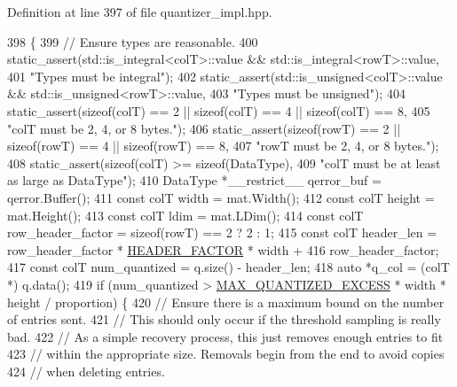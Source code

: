 Definition at line 397 of file quantizer\+\_\+impl.\+hpp.


\begin{DoxyCode}
398                                                                    \{
399   \textcolor{comment}{// Ensure types are reasonable.}
400   static\_assert(std::is\_integral<colT>::value && std::is\_integral<rowT>::value,
401                 \textcolor{stringliteral}{"Types must be integral"});
402   static\_assert(std::is\_unsigned<colT>::value && std::is\_unsigned<rowT>::value,
403                 \textcolor{stringliteral}{"Types must be unsigned"});
404   static\_assert(\textcolor{keyword}{sizeof}(colT) == 2 || \textcolor{keyword}{sizeof}(colT) == 4 || \textcolor{keyword}{sizeof}(colT) == 8,
405                 \textcolor{stringliteral}{"colT must be 2, 4, or 8 bytes."});
406   static\_assert(\textcolor{keyword}{sizeof}(rowT) == 2 || \textcolor{keyword}{sizeof}(rowT) == 4 || \textcolor{keyword}{sizeof}(rowT) == 8,
407                 \textcolor{stringliteral}{"rowT must be 2, 4, or 8 bytes."});
408   static\_assert(\textcolor{keyword}{sizeof}(colT) >= \textcolor{keyword}{sizeof}(DataType),
409                 \textcolor{stringliteral}{"colT must be at least as large as DataType"});
410   DataType *\_\_restrict\_\_ qerror\_buf = qerror.Buffer();
411   \textcolor{keyword}{const} colT width = mat.Width();
412   \textcolor{keyword}{const} colT height = mat.Height();
413   \textcolor{keyword}{const} colT ldim = mat.LDim();
414   \textcolor{keyword}{const} colT row\_header\_factor = \textcolor{keyword}{sizeof}(rowT) == 2 ? 2 : 1;
415   \textcolor{keyword}{const} colT header\_len = row\_header\_factor * \hyperlink{classlbann_1_1lbann__quantizer_afb4315625e371169cabfac56c3f75d37}{HEADER\_FACTOR} * width +
416                           row\_header\_factor;
417   \textcolor{keyword}{const} colT num\_quantized = q.size() - header\_len;
418   \textcolor{keyword}{auto} *q\_col = (colT *) q.data();
419   \textcolor{keywordflow}{if} (num\_quantized > \hyperlink{classlbann_1_1lbann__quantizer_abe63d57e62be1b498848f7920de4433a}{MAX\_QUANTIZED\_EXCESS} * width * height / proportion) \{
420     \textcolor{comment}{// Ensure there is a maximum bound on the number of entries sent.}
421     \textcolor{comment}{// This should only occur if the threshold sampling is really bad.}
422     \textcolor{comment}{// As a simple recovery process, this just removes enough entries to fit}
423     \textcolor{comment}{// within the appropriate size. Removals begin from the end to avoid copies}
424     \textcolor{comment}{// when deleting entries.}

\end{DoxyCode}
